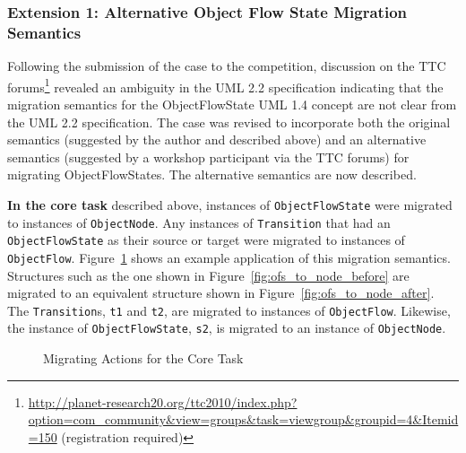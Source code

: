 \subsubsection{Extension 1: Alternative Object Flow State Migration Semantics}
\label{sub:object_flow_states}
Following the submission of the case to the competition, discussion on the TTC forums\footnote{\url{http://planet-research20.org/ttc2010/index.php?option=com_community&view=groups&task=viewgroup&groupid=4&Itemid=150} (registration required)} revealed an ambiguity in the UML 2.2 specification indicating that the migration semantics for the ObjectFlowState UML 1.4 concept are not clear from the UML 2.2 specification. The case was revised to incorporate both the original semantics (suggested by the author and described above) and an alternative semantics (suggested by a workshop participant via the TTC forums) for migrating ObjectFlowStates. The alternative semantics are now described.

\textbf{In the core task} described above, instances of \texttt{Ob\-je\-ctFl\-owSt\-a\-te} were migrated to instances of \texttt{Ob\-je\-ctNo\-de}. Any instances of \texttt{Tr\-an\-si\-ti\-on} that had an \texttt{Ob\-je\-ctFl\-owSt\-a\-te} as their source or target were migrated to instances of \texttt{Ob\-je\-ctFl\-ow}. Figure~\ref{fig:ofs_to_node} shows an example application of this migration semantics. Structures such as the one shown in Figure~\ref{fig:ofs_to_node_before} are migrated to an equivalent structure shown in Figure~\ref{fig:ofs_to_node_after}. The \texttt{Tr\-an\-si\-ti\-on}s, \texttt{t1} and \texttt{t2}, are migrated to instances of \texttt{Ob\-je\-ctFl\-ow}. Likewise, the instance of \texttt{Ob\-je\-ctFl\-owSt\-a\-te}, \texttt{s2}, is migrated to an instance of \texttt{Ob\-je\-ctNo\-de}.

\begin{figure}[htbp]
	\centering
	\caption{Migrating Actions for the Core Task}
\label{fig:ofs_to_node}
\end{figure}


